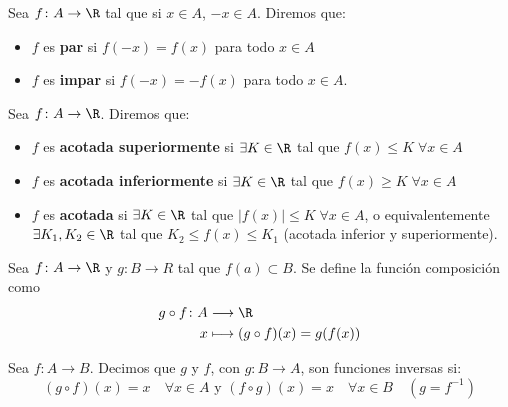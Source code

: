 \begin{proposition}
	Sea \(f \colon A \to \R \) tal que si \(x \in A \), \(-x \in A \). Diremos que:
	\begin{itemize}
		\item \(f \) es \textbf{par}  si \(f(-x) = f(x )\) para todo \(x \in A \)
		\item \(f \) es \textbf{impar}  si \(f(-x) = -f(x )\) para todo \(x \in A \).
	\end{itemize}
\end{proposition}
\begin{definition}
	Sea \(f \colon A \to \R \). Diremos que:
	\begin{itemize}
		\item \(f \) es \textbf{acotada superiormente}  si \(\exists K \in \R \) tal que \(f(x) \leq K \; \forall x \in A \)
		\item \(f \) es \textbf{acotada inferiormente}  si \(\exists K \in \R \) tal que \(f(x) \geq K \; \forall x \in A \)
		\item \(f \) es \textbf{acotada}  si \(\exists K \in \R \) tal que \(|f(x)| \leq K \; \forall x \in A\), o equivalentemente \(\exists K_1,K_2 \in \R \) tal que \(K_2 \leq f(x) \leq K_1 \) (acotada inferior y superiormente).
	\end{itemize}
\end{definition}
\begin{definition}[Composición]
	Sea \(f \colon A \to \R \) y \(g : B \to R \) tal que \(f(a) \subset B \). Se define la función composición como
	\[
		\begin{aligned}
			g \circ f \colon A & \longrightarrow  \R                   \\
			x                  & \longmapsto (g \circ f )(x) = g(f(x))
		\end{aligned}
	\]
\end{definition}
\begin{definition}[Inversa]
	Sea \(f \colon A \to B \). Decimos que \(g \) y \(f \), con \(g \colon B \to A \), son funciones inversas si:
	\[
		(g \circ f)(x) = x \quad \forall x \in A
		\text{ y }
		(f \circ g)(x) = x \quad \forall x \in B \quad (g = f^{-1} )
	\]
\end{definition}

